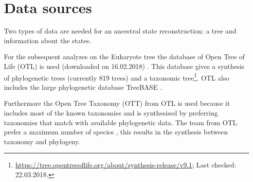   \section{Data sources} \label{sec:methods - data sources}
    Two types of data are needed for an ancestral state reconstruction: a tree and information about 
      the states.

    For the subsequent analyzes on the Eukaryote tree the database of Open Tree of Life (OTL) is used 
      (downloaded on 16.02.2018) \cite{Hinchliff2015}. This database gives a synthesis of phylogenetic 
      trees (currently 819 trees) and a taxonomic tree\footnote{
        \hyperlink{https://tree.opentreeoflife.org/about/synthesis-release/v9.1}
        {https://tree.opentreeoflife.org/about/synthesis-release/v9.1}; Last checked: 22.03.2018.
      }. OTL also  includes the large phylogenetic database TreeBASE \cite{Hinchliff2015}.
      
    Furthermore the Open Tree Taxonomy (OTT) from OTL is used because it includes most of the known 
      taxonomies and is synthesised by preferring taxonomies that match with available phylogenetic 
      data. The team from OTL prefer a maximum number of species \cite{Hinchliff2015}, this results 
      in the synthesis between taxonomy and phylogeny.

